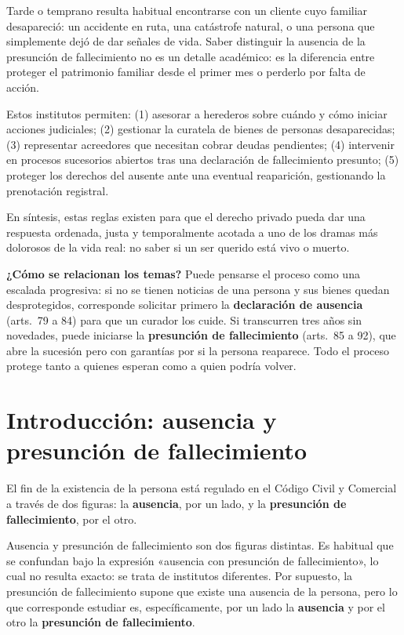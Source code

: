 \documentclass[12pt,oneside]{book}
\begin{document}
\begin{note}
Tarde o temprano resulta habitual encontrarse con un cliente cuyo familiar desapareció: un accidente en ruta, una catástrofe natural, o una persona que simplemente dejó de dar señales de vida. Saber distinguir la ausencia de la presunción de fallecimiento no es un detalle académico: es la diferencia entre proteger el patrimonio familiar desde el primer mes o perderlo por falta de acción.

Estos institutos permiten: (1) asesorar a herederos sobre cuándo y cómo iniciar acciones judiciales; (2) gestionar la curatela de bienes de personas desaparecidas; (3) representar acreedores que necesitan cobrar deudas pendientes; (4) intervenir en procesos sucesorios abiertos tras una declaración de fallecimiento presunto; (5) proteger los derechos del ausente ante una eventual reaparición, gestionando la prenotación registral.

En síntesis, estas reglas existen para que el derecho privado pueda dar una respuesta ordenada, justa y temporalmente acotada a uno de los dramas más dolorosos de la vida real: no saber si un ser querido está vivo o muerto.
\end{note}

\textbf{¿Cómo se relacionan los temas?} Puede pensarse el proceso como una escalada progresiva: si no se tienen noticias de una persona y sus bienes quedan desprotegidos, corresponde solicitar primero la \textbf{declaración de ausencia} (arts.~79 a 84) para que un curador los cuide. Si transcurren tres años sin novedades, puede iniciarse la \textbf{presunción de fallecimiento} (arts.~85 a 92), que abre la sucesión pero con garantías por si la persona reaparece. Todo el proceso protege tanto a quienes esperan como a quien podría volver.

\section{Introducción: ausencia y presunción de fallecimiento}

El fin de la existencia de la persona está regulado en el Código Civil y
Comercial a través de dos figuras: la \textbf{ausencia}, por un lado, y la
\textbf{presunción de fallecimiento}, por el otro.

Ausencia y presunción de fallecimiento son dos figuras distintas. Es
habitual que se confundan bajo la expresión «ausencia con presunción de
fallecimiento», lo cual no resulta exacto: se trata de institutos
diferentes. Por supuesto, la presunción de fallecimiento supone que existe
una ausencia de la persona, pero lo que corresponde estudiar es,
específicamente, por un lado la \textbf{ausencia} y por el otro la
\textbf{presunción de fallecimiento}.
\end{document}
